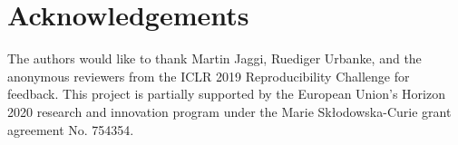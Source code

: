 \section*{Acknowledgements}
The authors would like to thank Martin Jaggi, Ruediger Urbanke, and the anonymous reviewers from the ICLR 2019 Reproducibility Challenge for feedback. This project is partially supported by the European Union’s Horizon 2020 research and innovation program under the Marie Skłodowska-Curie grant agreement No. 754354.
